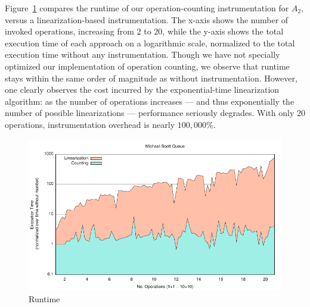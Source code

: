 Figure~\ref{fig:data:runtime} compares the runtime of our operation-counting
instrumentation for $A_2$, versus a linearization-based instrumentation. The
x-axis shows the number of invoked operations, increasing from $2$ to $20$,
while the y-axis shows the total execution time of each approach on a
logarithmic scale, normalized to the total execution time without any
instrumentation. Though we have not specially optimized our implementation of
operation counting, we observe that runtime stays within the same order of
magnitude as without instrumentation. However, one clearly observes the cost
incurred by the exponential-time linearization algorithm: as the number of
operations increases --- and thus exponentially the number of possible
linearizations --- performance seriously degrades. With only $20$ operations,
instrumentation overhead is nearly $100,000$\%.


\begin{figure}
  \centering
  \includegraphics[width=\linewidth]{figures/lin-vs-counting-time}
  \caption{Runtime}
  \label{fig:data:runtime}
\end{figure}
